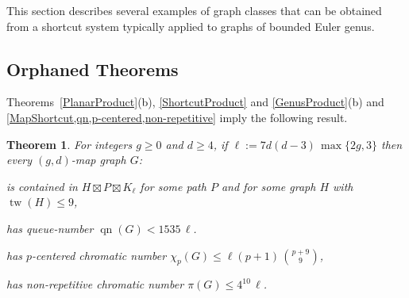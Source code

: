 \documentclass{patmorin}
\theoremstyle{plain}
\newtheorem{thm}{Theorem}
\theoremstyle{definition}
\newcommand{\note}[2]{\noindent{\color{red}[#1:~#2]}}
\DeclareMathOperator{\tw}{tw}
\DeclareMathOperator{\qn}{qn}
\renewcommand{\geq}{\geqslant}
\renewcommand{\leq}{\leqslant}
\begin{document}





This section describes several examples of graph classes that can be obtained from a shortcut system typically applied to graphs of bounded Euler genus.

\subsection{Orphaned Theorems}

Theorems~\ref{PlanarProduct}(b),  \ref{ShortcutProduct} and  \ref{GenusProduct}(b) and \cref{MapShortcut,qn,p-centered,non-repetitive} imply the following result.


\begin{thm}
\label{MapPartition}
For integers $g\geq 0$ and $d\geq 4$, if $\ell:=  7d(d-3)\, \max\{2g,3\}$ then every $(g,d)$-map graph $G$:
\begin{compactitem}
\item is contained in $H \boxtimes P \boxtimes K_{\ell}$ for some path $P$ and for some graph $H$ with $\tw(H)\leq 9$,
\item has queue-number $\qn(G) <  1535\, \ell $.
\item has $p$-centered chromatic number $\chi_p(G) \leq \ell (p+1)\,  \binom{p+9}{9}$,
\item has non-repetitive chromatic number $ \pi(G) \leq 4^{10}\,\ell $.
\end{compactitem}
\end{thm}
\end{document}
